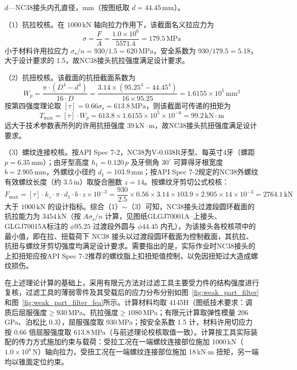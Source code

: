 $d$---NC38接头内孔直径，mm（按图纸取 $d = 44.45$\,mm）。

（1）抗拉校核。在 $1000\,\text{kN}$ 轴向拉力作用下，该截面名义拉应力为
\begin{equation}
    \sigma = \frac{F}{A} = \frac{1.0 \times 10^{6}}{5571.4} = 179.5\,\text{MPa}
\end{equation}
小于材料许用拉应力 $\sigma_{\mathrm{s}}/n = 930/1.5 = 620\,\text{MPa}$，安全系数为 $930/179.5 = 5.18$，大于设计要求的 1.5，故NC38接头抗拉强度满足设计要求。

（2）抗扭校核。该截面的抗扭截面系数为
\begin{equation}
    W_p = \frac{\pi \cdot (D^4 - d^4)}{16 \cdot D} = \frac{3.14 \times (95.25^4 - 44.45^4)}{16 \times 95.25} = 1.6155 \times 10^{5}\,\text{mm}^3
\end{equation}
按第四强度理论取 $[\tau] = 0.66\sigma_{\mathrm{s}} = 613.8\,\text{MPa}$，则该截面可传递的扭矩为
\begin{equation}
    T_{\max} = [\tau] \cdot W_p = 613.8 \times 1.6155 \times 10^{5} \times 10^{-6} = 99.2\,\text{kN}\cdot\text{m}
\end{equation}
远大于技术参数表所列的许用抗扭强度 $39\,\text{kN}\cdot\text{m}$，故NC38接头抗扭强度满足设计要求。

（3）螺纹连接校核。按API Spec 7-2，NC38为V-0.038R牙型、每英寸4牙（螺距 $p = 6.35\,\text{mm}$）；由牙型高度 $h_1 = 0.120\,p$ 及牙侧角 $30^\circ$ 可算得牙根宽度 $b = 2.905\,\text{mm}$，外螺纹小径约 $d_1 = 103.9\,\text{mm}$；按API Spec 7-2规定的NC38外螺纹有效螺纹长度（约 $3.5\,\text{in}$）取旋合圈数 $z = 14$。按螺纹牙剪切公式校核：
\begin{equation}
    F_{\max} = [\tau] \cdot k_z \cdot \pi \cdot d_1 \cdot b \cdot z \times 10^{-3}
             = \frac{930}{2.5} \times 0.56 \times 3.14 \times 103.9 \times 2.905 \times 14 \times 10^{-3} = 2764.1\,\text{kN}
\end{equation}
大于 $1000\,\text{kN}$ 的设计指标。综合（1）$\sim$（3）可知，NC38接头过渡段圆环截面的抗拉能力为 $3454\,\text{kN}$（按 $A\sigma_{\mathrm{s}}/n$ 计算，见图纸GLGJ70001A--上接头、GLGJ70015A标注的 $\phi 95.25$ 过渡段外圆与 $\phi 44.45$ 内孔），为该接头各校核项中的最小值，即在拉、扭载荷下 NC38 接头以过渡段圆环截面为控制截面，其抗拉、抗扭与螺纹牙剪切强度均满足设计要求。需要指出的是，实际作业时NC38接头的上扣扭矩应按API Spec 7-2推荐的螺纹脂上扣扭矩值控制，以免因扭矩过大造成螺纹损伤。


在上述理论计算的基础上，采用有限元方法对过滤工具主要受力件的结构强度进行复核，过滤工具的薄弱零件及其受载后的应力分布分别如图~\ref{fig:weak_part_filter}和图~\ref{fig:weak_part_filter_fea}所示。计算材料均取 4145H（图纸技术要求：调质后屈服强度$\ge 930$\,MPa、抗拉强度$\ge 1080$\,MPa；有限元计算取弹性模量 206\,GPa、泊松比 0.3），屈服强度取 930\,MPa；按安全系数 1.5 计，材料许用切应力按 0.66 倍屈服强度取 613.8\,MPa（与前述理论校核取值一致）。计算按工具实际装配的传力方式施加约束与载荷：受拉工况在一端螺纹连接部位施加 1000\,kN（\(1.0\times10^{6}\)\,N）轴向拉力，受扭工况在一端螺纹连接部位施加 18\,kN$\cdot$m 扭矩，另一端均以锥面定位约束。

